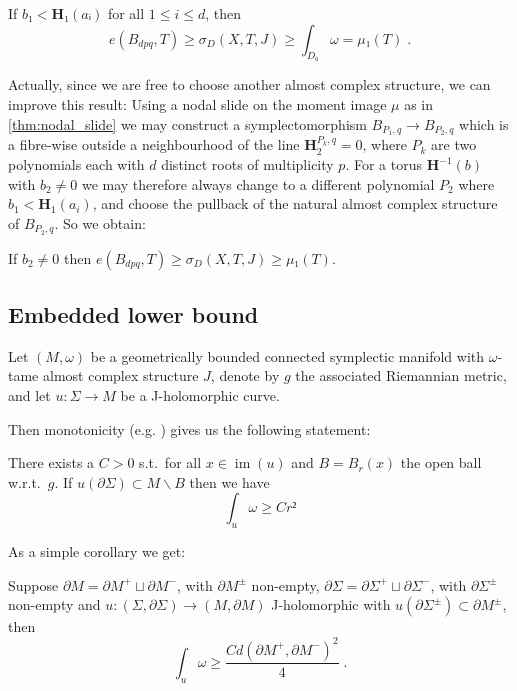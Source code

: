 \documentclass[12pt,a4paper,draft]{scrartcl}
\DeclareMathOperator{\im}{im}
\begin{document}
\begin{lemma}
  \label{thm:lower_bound_tmp}
  If $b₁ < \symbf{H}₁(aᵢ)$ for all $1 ≤ i ≤ d$, then
  \[e(B_{dpq},T) ≥ σ_D(X,T,J) ≥ ∫_{D₀} ω  = μ₁(T) \; .\]
\end{lemma}

Actually, since we are free to choose another almost complex structure, we can improve this result: 
Using a nodal slide on the moment image $μ$ as in \cref{thm:nodal_slide} we may construct a symplectomorphism $B_{P_1,q} → B_{P_2,q}$ which is a fibre-wise outside a neighbourhood of the line $\symbf{H}^{P_k,q}_2=0$, where $P_k$ are two polynomials each with $d$ distinct roots of multiplicity $p$.
For a torus $\symbf{H}^{-1}(b)$ with $b_2 ≠ 0$ we may therefore always change to a different polynomial $P_2$ where $b_1 < \symbf{H}_1(a_i)$, and choose the pullback of the natural almost complex structure of $B_{P_2,q}$. So we obtain:

\begin{lemma}
  \label{thm:lower_bound}
  If $b_2 ≠ 0$ then $e(B_{dpq},T) ≥ σ_D(X,T,J) ≥ μ₁(T)$.
\end{lemma}

\subsection{Embedded lower bound}

Let $(M,ω)$ be a geometrically bounded connected symplectic manifold with $ω$-tame almost complex structure $J$, denote by $g$ the associated Riemannian metric, and let $u\colon Σ → M$ be a J-holomorphic curve.

Then monotonicity (e.g. \cite[Proposition 4.3.1 (ii)]{sikorav1994}) gives us the following statement:

\begin{lemma}[Monotonicity]
  \label{thm:monotonicity}
  There exists a $C>0$ s.t.\ for all $x ∈ \im(u)$ and $B = B_r(x)$ the open ball w.r.t.\ $g$. If $u(∂Σ) ⊂ M ∖ B$ then we have
  \[∫_u ω ≥ C r²\]
\end{lemma}

As a simple corollary we get:

\begin{corollary}
  \label{cor:small_buffer}
  Suppose $∂M = ∂M^+ ⊔ ∂M^-$, with $∂M^±$ non-empty, $∂Σ = ∂Σ^+ ⊔ ∂Σ^-$, with $∂Σ^±$ non-empty and $u\colon (Σ,∂Σ) → (M,∂M)$ J-holomorphic with $u(∂Σ^±) ⊂ ∂M^±$, then
  \[∫_u ω ≥ \frac{C d(∂M^+,∂M^-)^2}{4} \; .\]
\end{corollary}
\end{document}
